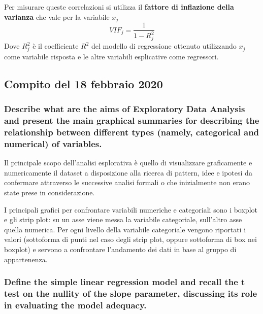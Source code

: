 \documentclass[
]{article}
\begin{document}
Per misurare queste correlazioni si utilizza il \textbf{fattore di
inflazione della varianza} che vale per la variabile \(x_j\)
\[ VIF_j = \frac{1}{1-R_j^2} \] Dove \(R_j^2\) è il coefficiente \(R^2\)
del modello di regressione ottenuto utilizzando \(x_j\) come variabile
risposta e le altre variabili esplicative come regressori.

\hypertarget{compito-del-18-febbraio-2020}{%
\subsection{Compito del 18 febbraio
2020}\label{compito-del-18-febbraio-2020}}

\hypertarget{describe-what-are-the-aims-of-exploratory-data-analysis-and-present-the-main-graphical-summaries-for-describing-the-relationship-between-different-types-namely-categorical-and-numerical-of-variables.}{%
\subsubsection{Describe what are the aims of Exploratory Data Analysis
and present the main graphical summaries for describing the relationship
between different types (namely, categorical and numerical) of
variables.}\label{describe-what-are-the-aims-of-exploratory-data-analysis-and-present-the-main-graphical-summaries-for-describing-the-relationship-between-different-types-namely-categorical-and-numerical-of-variables.}}

Il principale scopo dell'analisi esplorativa è quello di visualizzare
graficamente e numericamente il dataset a disposizione alla ricerca di
pattern, idee e ipotesi da confermare attraverso le successive analisi
formali o che inizialmente non erano state prese in considerazione.

I principali grafici per confrontare variabili numeriche e categoriali
sono i boxplot e gli strip plot: su un asse viene messa la variabile
categoriale, sull'altro asse quella numerica. Per ogni livello della
variabile categoriale vengono riportati i valori (sottoforma di punti
nel caso degli strip plot, oppure sottoforma di box nei boxplot) e
servono a confrontare l'andamento dei dati in base al gruppo di
appartenenza.

\hypertarget{define-the-simple-linear-regression-model-and-recall-the-t-test-on-the-nullity-of-the-slope-parameter-discussing-its-role-in-evaluating-the-model-adequacy.}{%
\subsubsection{Define the simple linear regression model and recall the
t test on the nullity of the slope parameter, discussing its role in
evaluating the model
adequacy.}\label{define-the-simple-linear-regression-model-and-recall-the-t-test-on-the-nullity-of-the-slope-parameter-discussing-its-role-in-evaluating-the-model-adequacy.}}
\end{document}
